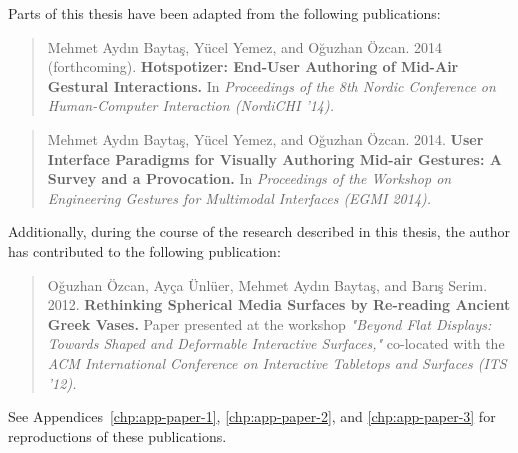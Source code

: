 \noindent Parts of this thesis have been adapted from the following publications:

\begin{quote}
Mehmet Aydın Baytaş, Yücel Yemez, and Oğuzhan Özcan. 2014 (forthcoming). \textbf{Hotspotizer: End-User Authoring of Mid-Air Gestural Interactions.} In \emph{Proceedings of the 8th Nordic Conference on Human-Computer Interaction (NordiCHI '14).}
\end{quote}

\begin{quote}
Mehmet Aydın Baytaş, Yücel Yemez, and Oğuzhan Özcan. 2014. \textbf{User Interface Paradigms for Visually Authoring Mid-air Gestures: A Survey and a Provocation.} In \emph{Proceedings of the Workshop on Engineering Gestures for Multimodal Interfaces (EGMI 2014).}
\end{quote}

\noindent Additionally, during the course of the research described in this thesis, the author has contributed to the following publication:

\begin{quote}
Oğuzhan Özcan, Ayça Ünlüer, Mehmet Aydın Baytaş, and Barış Serim. 2012. \textbf{Rethinking Spherical Media Surfaces by Re-reading Ancient Greek Vases.} Paper presented at the workshop \emph{"Beyond Flat Displays: Towards Shaped and Deformable Interactive Surfaces,"} co-located with the \emph{ACM International Conference on Interactive Tabletops and Surfaces (ITS '12).}
\end{quote}

\noindent See Appendices~\ref{chp:app-paper-1}, \ref{chp:app-paper-2}, and \ref{chp:app-paper-3} for reproductions of these publications.